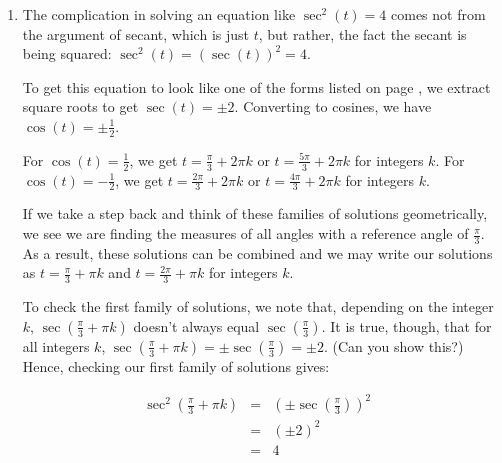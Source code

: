 \documentclass{ximera}
\begin{document}
\begin{example}
\begin{explanation}
\begin{enumerate}
 Graphing $y = \cot(3t)$ and $y=0$ (the $t$-axis), we confirm our result.\footnote{On many calculators, there is no function button for cotangent.  In that case, we would use the quotient identity and graph $y = \frac{\cos(3t)}{\sin(3t)}$ instead.  The reader is invited to see what happens if we would graph $y= \frac{1}{\tan(3t)}$ instead.}

 \begin{center}
 \end{center}

\item The complication in solving an equation like $\sec^{2}(t) = 4$ comes not from the argument of secant, which is just $t$, but rather, the fact the secant is being squared:  $\sec^{2}(t) = (\sec(t))^2 = 4$.

 

To get this equation to look like one of the forms listed on page \pageref{trigeqnstrategy1}, we extract square roots to get $\sec(t) = \pm 2$. Converting to cosines, we have  $\cos(t) = \pm \frac{1}{2}$.  

 

For $\cos(t) = \frac{1}{2}$, we get $t = \frac{\pi}{3} + 2\pi k$ or $t = \frac{5\pi}{3} + 2\pi k$ for integers $k$.  For $\cos(t) = -\frac{1}{2}$, we get $t = \frac{2\pi}{3} + 2\pi k$ or $t = \frac{4\pi}{3} + 2\pi k$ for integers $k$. 

 

If we take a step back and think of these families of solutions geometrically, we see we are finding the measures of all angles with a reference angle of $\frac{\pi}{3}$.  As a result, these solutions can be combined and we may write our solutions as $t = \frac{\pi}{3} + \pi k$ and $t = \frac{2\pi}{3} + \pi k$ for integers $k$. 

 

To check the first family of solutions, we note that, depending on the integer $k$,  $\sec\left(\frac{\pi}{3} + \pi k\right)$ doesn't always equal $\sec\left(\frac{\pi}{3}\right)$.  It is true, though,  that for all integers $k$,  $\sec\left(\frac{\pi}{3} + \pi k\right) = \pm \sec\left(\frac{\pi}{3}\right) = \pm 2$.  (Can you show this?)  Hence, checking our first family of solutions gives:


\[ \begin{array}{rclr}

\sec^{2}\left(\frac{\pi}{3} + \pi k\right)  &  = &  \left( \pm \sec\left(\frac{\pi}{3}\right)\right)^2  & \\   
& =  &   (\pm 2)^2 &  \\   
& =  & 4 & \\
\end{array}\] 


\end{enumerate}
\end{explanation}
\end{example}
\end{document}
